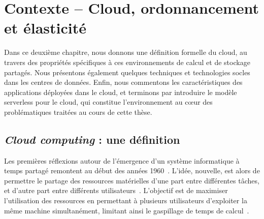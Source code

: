 \clearemptydoublepage
\chapter{Contexte -- Cloud, ordonnancement et élasticité}
\label{chapter:context}

Dans ce deuxième chapitre, nous donnons une définition formelle du cloud, au travers des propriétés spécifiques à ces environnements de calcul et de stockage partagés. Nous présentons également quelques techniques et technologies socles dans les centres de données. Enfin, nous commentons les caractéristiques des applications déployées dans le cloud, et terminons par introduire le modèle serverless pour le cloud, qui constitue l'environnement au cœur des problématiques traitées au cours de cette thèse.

\section{\textit{Cloud computing} : une définition}

Les premières réflexions autour de l'émergence d'un système informatique à temps partagé remontent au début des années 1960~\cite{greenberger1962management}. L'idée, nouvelle, est alors de permettre le partage des ressources matérielles d'une part entre différentes tâches, et d'autre part entre différents utilisateurs~\cite{meyerVirtualMachineTimesharing1970}. L'objectif est de maximiser l'utilisation des ressources en permettant à plusieurs utilisateurs d'exploiter la même machine simultanément, limitant ainsi le gaspillage de temps de calcul~\cite{corbato1962experimental}.

